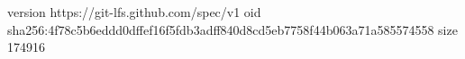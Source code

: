 version https://git-lfs.github.com/spec/v1
oid sha256:4f78c5b6eddd0dffef16f5fdb3adff840d8cd5eb7758f44b063a71a585574558
size 174916
